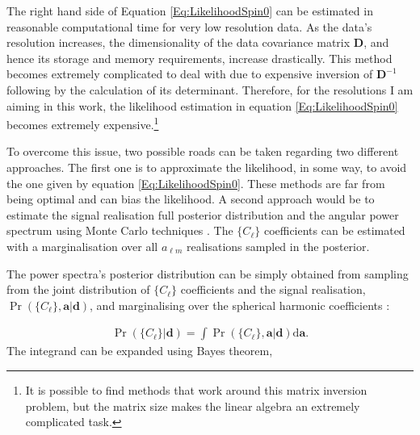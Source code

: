 \qquad The right hand side of Equation \eqref{Eq:LikelihoodSpin0} can be estimated in reasonable computational time for very low resolution data. As the data's resolution increases, the dimensionality of the data covariance matrix $\mathbf{D}$, and hence its storage and memory requirements, increase drastically. This method becomes extremely complicated to deal with due to expensive inversion of $\mathbf{D}^{-1}$ following by the calculation of its determinant. Therefore, for the resolutions I am aiming in this work, the likelihood estimation in equation \eqref{Eq:LikelihoodSpin0} becomes extremely expensive.\footnote{It is possible to find methods that work around this matrix inversion problem, but the matrix size makes the linear algebra an extremely complicated task.} 

\qquad To overcome this issue, two possible roads can be taken regarding two different approaches. The first one is to approximate the likelihood, in some way, to avoid the one given by equation \eqref{Eq:LikelihoodSpin0}. These methods are far from being optimal and can bias the likelihood. A second approach would be to estimate the signal realisation full posterior distribution and the angular power spectrum using Monte Carlo techniques \citep{Taylor2008,AlmostBlackPearl2016}. The $\{ C_{\ell}\}$ coefficients can be estimated with a marginalisation over all $a_{\ell m}$ realisations sampled in the posterior. 

\qquad The power spectra's posterior distribution can be simply obtained from sampling from the joint distribution of $\{C_{\ell}\}$ coefficients and the signal realisation, $\Pr(\{C_{\ell}\},\mathbf{a}|\mathbf{d})$, and marginalising over the spherical harmonic coefficients \citep{Eriksen2004,Wandelt2004,Taylor2008,AlmostBlackPearl2016}:

\begin{align}
\Pr(\{C_{\ell}\}|\mathbf{d}) = \int\Pr(\{C_{\ell}\},\mathbf{a}|\mathbf{d})\text{d}\mathbf{a}.
\label{Eq:LikelihInt}
\end{align}
\noindent The integrand can be expanded using Bayes theorem,

